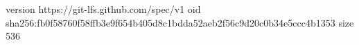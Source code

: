 version https://git-lfs.github.com/spec/v1
oid sha256:fb0f58760f58ffb3e9f654b405d8c1bdda52aeb2f56c9d20c0b34e5ccc4b1353
size 536
